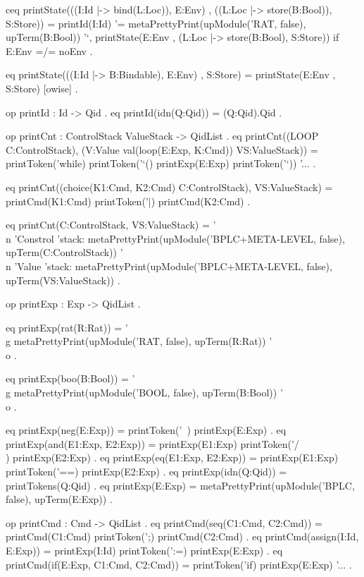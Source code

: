 \documentclass{llncs}%
\begin{document}
    ceq printState(((I:Id |-> bind(L:Loc)), E:Env) ,
                   ((L:Loc |-> store(B:Bool)), S:Store)) =
            printId(I:Id) '= metaPrettyPrint(upModule('RAT, false), upTerm(B:Bool)) '`,
            printState(E:Env , (L:Loc |-> store(B:Bool), S:Store))
    if E:Env =/= noEnv .

    eq printState(((I:Id |-> B:Bindable), E:Env) , S:Store) =
       printState(E:Env , S:Store) [owise] .

    op printId : Id -> Qid .
    eq printId(idn(Q:Qid)) = (Q:Qid).Qid .

    op printCnt : ControlStack ValueStack -> QidList .
    eq printCnt((LOOP C:ControlStack), (V:Value val(loop(E:Exp, K:Cmd)) VS:ValueStack)) =
           printToken('while) printToken('`() printExp(E:Exp) printToken('`)) '... .

    eq printCnt((choice(K1:Cmd, K2:Cmd) C:ControlStack), VS:ValueStack) =
           printCmd(K1:Cmd) printToken('|) printCmd(K2:Cmd) .

    eq printCnt(C:ControlStack, VS:ValueStack) =
           '\\n 'Constrol 'stack:
               metaPrettyPrint(upModule('BPLC+META-LEVEL, false),
               upTerm(C:ControlStack))
           '\\n 'Value 'stack:
           metaPrettyPrint(upModule('BPLC+META-LEVEL, false),
           upTerm(VS:ValueStack)) .

    op printExp : Exp -> QidList .

    eq printExp(rat(R:Rat)) = '\\g metaPrettyPrint(upModule('RAT, false),
       upTerm(R:Rat)) '\\o .

    eq printExp(boo(B:Bool)) = '\\g metaPrettyPrint(upModule('BOOL, false),
       upTerm(B:Bool)) '\\o .

    eq printExp(neg(E:Exp)) = printToken('~) printExp(E:Exp) .
    eq printExp(and(E1:Exp, E2:Exp)) = printExp(E1:Exp) printToken('/\\) printExp(E2:Exp) .
    eq printExp(eq(E1:Exp, E2:Exp)) = printExp(E1:Exp) printToken('==) printExp(E2:Exp) .
    eq printExp(idn(Q:Qid)) = printTokens(Q:Qid) .
    eq printExp(E:Exp) = metaPrettyPrint(upModule('BPLC, false), upTerm(E:Exp)) .

    op printCmd : Cmd -> QidList .
    eq printCmd(seq(C1:Cmd, C2:Cmd)) = printCmd(C1:Cmd) printToken(';) printCmd(C2:Cmd) .
    eq printCmd(assign(I:Id, E:Exp)) = printExp(I:Id) printToken(':=) printExp(E:Exp) .
    eq printCmd(if(E:Exp, C1:Cmd, C2:Cmd)) = printToken('if) printExp(E:Exp) '... .
\end{document}
